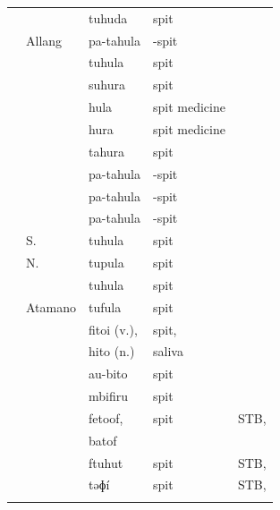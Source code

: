 {\begin{xltabular}[l]{\linewidth}{>{\hspace{-\tabcolsep}}l<{\hspace{-\tabcolsep}}>{\hspace{-\tabcolsep}\enspace}lll>{\raggedright\arraybackslash}X}
	&		&	{\hr\hr}tuhuda	&	spit	&		\\
	&	Allang	&	{\hr\hr}pa-tahula	&	-spit	&		\\
	&		&	{\hr\hr}tuhula	&	spit	&		\\
	&		&	{\hr\hr}suhura	&	spit	&		\\
	&		&	{\hr\hr}hula	&	spit medicine	&		\\
	&		&	{\hr\hr}hura	&	spit medicine	&		\\
	&		&	{\hr\hr}tahura	&	spit	&		\\
	&		&	{\hr\hr}pa-tahula	&	-spit	&		\\
	&		&	{\hr\hr}pa-tahula	&	-spit	&		\\
	&		&	{\hr\hr}pa-tahula	&	-spit	&		\\
	&	S. 	&	{\hr\hr}tuhula	&	spit	&		\\
	&	N.	&	{\hr\hr}tupula	&	spit	&		\\
	&		&	{\hr\hr}tuhula	&	spit	&		\\
	&	Atamano	&	{\hr\hr}tufula	&	spit	&		\\
	&		&	{\hr\hr}fitoi (v.),	&	spit,	&		\\ \hhline{~}
	&						&	{\hr\hr}hito (n.)	&	saliva	&	\hp{ }	\\
	&		&	{\hr\hr}au-bito	&	spit	&		\\ \midrule\hhline{~}
	&		&	{\hr\hr}mbifiru	&	spit	&		\\ \midrule\hhline{~}
	&		&	{\hr\hr}fetoof,&	spit	&	STB, 	\\	\hhline{~}
	&			&	{\hr\hr}batof	&	\hp{ }	&	\\
	&		&	{\hr\hr}ftuhut	&	spit	&	STB, 	\\
	&		&	{\hr\hr}təɸí	&	spit	&	STB, 	\\
\lspbottomrule
\end{xltabular}\addtocounter{table}{-1}}